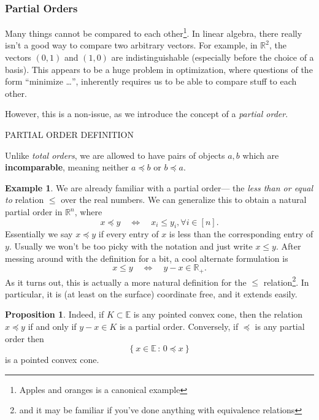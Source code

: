 \documentclass[11pt]{article}
\numberwithin{equation}{section}
\theoremstyle{definition}
\newtheorem{example}[theorem]{Example}
\newtheorem{proposition}[theorem]{Proposition}
\newcommand{\bE}{\mathbb{E}}
\newcommand{\bR}{\mathbb{R}}
\newcommand{\set}[2]{\left\{#1\,:\,#2\right\}}
\begin{document}
\subsubsection{Partial Orders}
Many things cannot be compared to each other\footnote{Apples and oranges is a canonical example}. In linear algebra, there really isn't a good way to compare two arbitrary vectors. For example, in $\bR^2$, the vectors $(0, 1)$ and $(1, 0)$ are indistinguishable (especially before the choice of a basis). This appears to be a huge problem in optimization, where questions of the form ``minimize \dots'', inherently requires us to be able to compare stuff to each other. 

However, this is a non-issue, as we introduce the concept of a \textit{partial order}.

PARTIAL ORDER DEFINITION

Unlike \textit{total orders}, we are allowed to have pairs of objects $a, b$ which are \textbf{incomparable}, meaning neither $a\preceq b$ or $b\preceq a$.

\begin{example}
    We are already familiar with a partial order--- the \textit{less than or equal to} relation $\le$ over the real numbers. We can generalize this to obtain a natural partial order in $\bR^n$, where
    \begin{equation}
        x\preceq y\quad\iff\quad x_i\le y_i, \forall i\in [n].
    \end{equation}
    Essentially we say $x\preceq y$ if every entry of $x$ is less than the corresponding entry of $y$. Usually we won't be too picky with the notation and just write $x\le y$. After messing around with the definition for a bit, a cool alternate formulation is
    \begin{equation}
        x\le y\quad\iff\quad y-x\in\bR_+.
    \end{equation}
    As it turns out, this is actually a more natural definition for the $\le$ relation\footnote{and it may be familiar if you've done anything with equivalence relations}. In particular, it is (at least on the surface) coordinate free, and it extends easily.
\end{example}
\begin{proposition}
    Indeed, if $K\subset\bE$ is any pointed convex cone, then the relation $x\preceq y$ if and only if $y-x\in K$ is a partial order. Conversely, if $\preceq$ is any partial order then
    \begin{equation}
        \set{x\in\bE}{0\preceq x}
    \end{equation}
    is a pointed convex cone.
\end{proposition}
\end{document}
